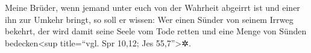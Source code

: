 Meine Brüder, wenn jemand unter euch von der Wahrheit
abgeirrt ist und einer ihn zur Umkehr bringt,  so soll er
wissen: Wer einen Sünder von seinem Irrweg bekehrt, der wird damit seine
Seele vom Tode retten und eine Menge von Sünden bedecken\textless sup
title=``vgl. Spr 10,12; Jes 55,7''\textgreater✲.
